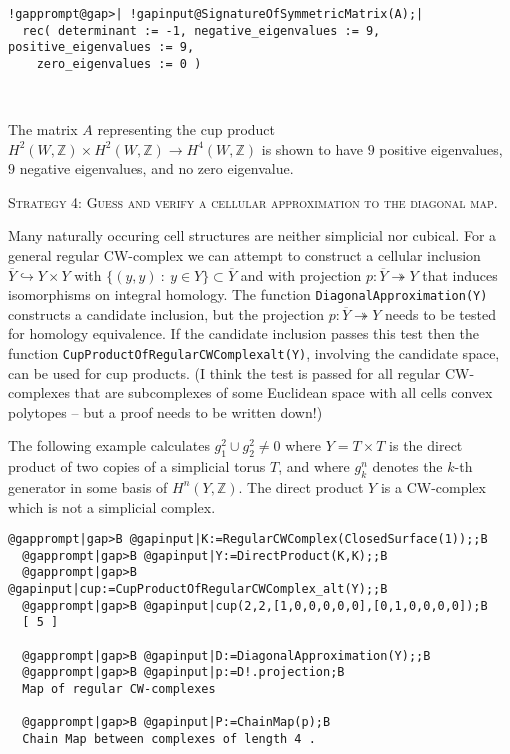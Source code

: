 \documentclass[a4paper,11pt]{report}
\begin{document}
{{\begin{Verbatim}[commandchars=!@|,fontsize=\small,frame=single,label=Example]
  !gapprompt@gap>| !gapinput@SignatureOfSymmetricMatrix(A);|
  rec( determinant := -1, negative_eigenvalues := 9, positive_eigenvalues := 9,
    zero_eigenvalues := 0 )
  
  
\end{Verbatim}
 The matrix $A$ representing the cup product $H^2(W,\mathbb Z)\times H^2(W,\mathbb Z) \rightarrow H^4(W,\mathbb Z)$ is shown to have $9$ positive eigenvalues, $9$ negative eigenvalues, and no zero eigenvalue. 

\textsc{Strategy 4: Guess and verify a cellular approximation to the diagonal map.} 

Many naturally occuring cell structures are neither simplicial nor cubical.
For a general regular CW-complex we can attempt to construct a cellular
inclusion $\overline Y \hookrightarrow Y\times Y$ with $\{(y,y)\ :\ y\in Y\}\subset \overline Y$ and with projection $p\colon \overline Y \twoheadrightarrow Y$ that induces isomorphisms on integral homology. The function \texttt{DiagonalApproximation(Y)} constructs a candidate inclusion, but the projection $p\colon \overline Y \twoheadrightarrow Y$ needs to be tested for homology equivalence. If the candidate inclusion passes
this test then the function \texttt{CupProductOfRegularCWComplex{\textunderscore}alt(Y)}, involving the candidate space, can be used for cup products. (I think the
test is passed for all regular CW-complexes that are subcomplexes of some
Euclidean space with all cells convex polytopes -- but a proof needs to be
written down!) 

The following example calculates $g_1^2 \cup g_2^2 \ne 0$ where $Y=T\times T$ is the direct product of two copies of a simplicial torus $T$, and where $g_k^n$ denotes the $k$-th generator in some basis of $H^n(Y,\mathbb Z)$. The direct product $Y$ is a CW-complex which is not a simplicial complex. 
\begin{Verbatim}[commandchars=@|B,fontsize=\small,frame=single,label=Example]
  @gapprompt|gap>B @gapinput|K:=RegularCWComplex(ClosedSurface(1));;B
  @gapprompt|gap>B @gapinput|Y:=DirectProduct(K,K);;B
  @gapprompt|gap>B @gapinput|cup:=CupProductOfRegularCWComplex_alt(Y);;B
  @gapprompt|gap>B @gapinput|cup(2,2,[1,0,0,0,0,0],[0,1,0,0,0,0]);B
  [ 5 ]
  
  @gapprompt|gap>B @gapinput|D:=DiagonalApproximation(Y);;B
  @gapprompt|gap>B @gapinput|p:=D!.projection;B
  Map of regular CW-complexes
  
  @gapprompt|gap>B @gapinput|P:=ChainMap(p);B
  Chain Map between complexes of length 4 . 
  

\end{Verbatim}}}
\end{document}
